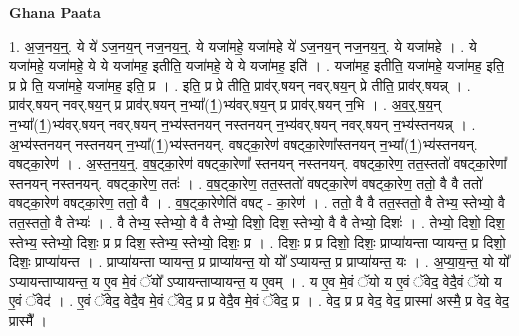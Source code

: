 \documentclass[17pt]{extarticle}
\begin{document}
\textbf{Ghana Paata } \newline

1. अ॒ज॒नय॒न्॒. ये ये॑ ऽज॒नय॒न् नज॒नय॒न्॒. ये यजा॑महे॒ यजा॑महे ये॑ ऽज॒नय॒न् नज॒नय॒न्॒. ये यजा॑महे । . ये यजा॑महे॒ यजा॑महे॒ ये ये यजा॑मह॒ इतीति॒ यजा॑महे॒ ये ये यजा॑मह॒ इति॑ । . यजा॑मह॒ इतीति॒ यजा॑महे॒ यजा॑मह॒ इति॒ प्र प्रे ति॒ यजा॑महे॒ यजा॑मह॒ इति॒ प्र । . इति॒ प्र प्रे तीति॒ प्राव॑र्.षयन् नवर्.षय॒न् प्रे तीति॒ प्राव॑र्.षयन्न् । . प्राव॑र्.षयन् नवर्.षय॒न् प्र प्राव॑र्.षयन् न॒भ्या᳚(1॒)भ्य॑वर्.षय॒न् प्र प्राव॑र्.षयन् न॒भि । . अ॒व॒र्॒.ष॒य॒न् न॒भ्या᳚(1॒)भ्य॑वर्.षयन् नवर्.षयन् न॒भ्य॑स्तनयन् नस्तनयन् न॒भ्य॑वर्.षयन् नवर्.षयन् न॒भ्य॑स्तनयन्न् । . अ॒भ्य॑स्तनयन् नस्तनयन् न॒भ्या᳚(1॒)भ्य॑स्तनयन्. वषट्का॒रेण॑ वषट्का॒रेणा᳚स्तनयन् न॒भ्या᳚(1॒)भ्य॑स्तनयन्. वषट्का॒रेण॑ । . अ॒स्त॒न॒य॒न्॒. व॒ष॒ट्का॒रेण॑ वषट्का॒रेणा᳚ स्तनयन् नस्तनयन्. वषट्का॒रेण॒ तत॒स्ततो॑ वषट्का॒रेणा᳚ स्तनयन् नस्तनयन्. वषट्का॒रेण॒ ततः॑ । . व॒ष॒ट्का॒रेण॒ तत॒स्ततो॑ वषट्का॒रेण॑ वषट्का॒रेण॒ ततो॒ वै वै ततो॑ वषट्का॒रेण॑ वषट्का॒रेण॒ ततो॒ वै । . व॒ष॒ट्का॒रेणेति॑ वषट् - का॒रेण॑ । . ततो॒ वै वै तत॒स्ततो॒ वै तेभ्य॒ स्तेभ्यो॒ वै तत॒स्ततो॒ वै तेभ्यः॑ । . वै तेभ्य॒ स्तेभ्यो॒ वै वै तेभ्यो॒ दिशो॒ दिश॒ स्तेभ्यो॒ वै वै तेभ्यो॒ दिशः॑ । . तेभ्यो॒ दिशो॒ दिश॒ स्तेभ्य॒ स्तेभ्यो॒ दिशः॒ प्र प्र दिश॒ स्तेभ्य॒ स्तेभ्यो॒ दिशः॒ प्र । . दिशः॒ प्र प्र दिशो॒ दिशः॒ प्राप्या॑यन्ता प्यायन्त॒ प्र दिशो॒ दिशः॒ प्राप्या॑यन्त । . प्राप्या॑यन्ता प्यायन्त॒ प्र प्राप्या॑यन्त॒ यो यो᳚ ऽप्यायन्त॒ प्र प्राप्या॑यन्त॒ यः । . अ॒प्या॒य॒न्त॒ यो यो᳚ ऽप्यायन्ताप्यायन्त॒ य ए॒व मे॒वं ॅयो᳚ ऽप्यायन्ताप्यायन्त॒ य ए॒वम् । . य ए॒व मे॒वं ॅयो य ए॒वं ॅवेद॒ वेदै॒वं ॅयो य ए॒वं ॅवेद॑ । . ए॒वं ॅवेद॒ वेदै॒व मे॒वं ॅवेद॒ प्र प्र वेदै॒व मे॒वं ॅवेद॒ प्र । . वेद॒ प्र प्र वेद॒ वेद॒ प्रास्मा॑ अस्मै॒ प्र वेद॒ वेद॒ प्रास्मै᳚ । \newline
\end{document}
